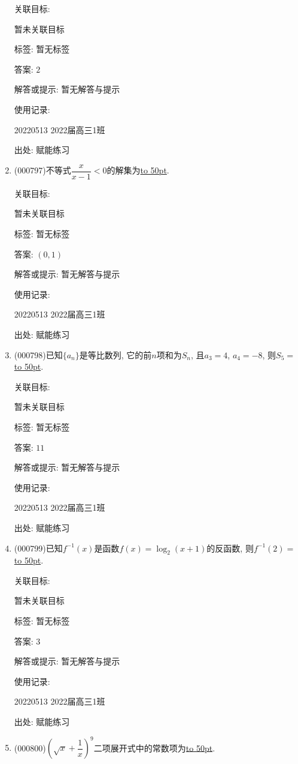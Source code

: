 \documentclass[10pt,a4paper]{article}
\newcommand{\blank}[1]{\underline{\hbox to #1pt{}}}
\begin{document}
\begin{enumerate}[1.]
关联目标:

暂未关联目标



标签: 暂无标签

答案: $2$

解答或提示: 暂无解答与提示

使用记录:

20220513	2022届高三1班	


出处: 赋能练习
\item { (000797)}不等式$\dfrac x{x-1}<0$的解集为\blank{50}.


关联目标:

暂未关联目标



标签: 暂无标签

答案: $(0,1)$

解答或提示: 暂无解答与提示

使用记录:

20220513	2022届高三1班	


出处: 赋能练习
\item { (000798)}已知$\{a_n\}$是等比数列, 它的前$n$项和为$S_n$, 且$a_3=4$, $a_4=-8$, 则$S_5=$\blank{50}.


关联目标:

暂未关联目标



标签: 暂无标签

答案: $11$

解答或提示: 暂无解答与提示

使用记录:

20220513	2022届高三1班	


出处: 赋能练习
\item { (000799)}已知$f^{-1}(x)$是函数$f(x)=\log_2(x+1)$的反函数, 则$f^{-1}(2)=$\blank{50}.


关联目标:

暂未关联目标



标签: 暂无标签

答案: $3$

解答或提示: 暂无解答与提示

使用记录:

20220513	2022届高三1班	


出处: 赋能练习
\item { (000800)}$(\sqrt x+\dfrac1x)^9$二项展开式中的常数项为\blank{50}.



\end{enumerate}
\end{document}
